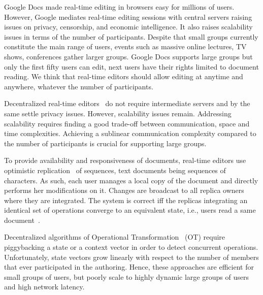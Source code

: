 
Google Docs made real-time editing in browsers easy for millions of
users. However, Google mediates real-time editing sessions with central servers
raising issues on privacy, censorship, and economic intelligence. It also raises
scalability issues in terms of the number of participants.  Despite that small
groups currently constitute the main range of users, events such as massive
online lectures, TV shows, conferences gather larger groups.  Google Docs
supports large groups but only the first fifty users can edit, next users have
their rights limited to document reading.  We think that real-time editors
should allow editing at anytime and anywhere, whatever the number of
participants.


Decentralized real-time editors~\cite{oster2006data, sun1998operational,
  sun2009contextbased} do not require intermediate servers and by the same
settle privacy issues. However, scalability issues remain.  Addressing
scalability requires finding a good trade-off between communication, space and
time complexities. Achieving a sublinear communication complexity compared to
the number of participants is crucial for supporting large groups.


To provide availability and responsiveness of documents, real-time editors use
optimistic replication~\cite{saito2005optimistic} of sequences, text documents
being sequences of characters. As such, each user manages a local copy of the
document and directly performs her modifications on it. Changes are broadcast to
all replica owners where they are integrated. The system is correct iff the
replicas integrating an identical set of operations converge to an equivalent
state, i.e., users read a same document~\cite{shapiro2011conflict}.

Decentralized algorithms of Operational
Transformation~\cite{sun2009contextbased} (OT) require piggybacking a state or a
context vector in order to detect concurrent operations. Unfortunately, state
vectors grow linearly with respect to the number of members that ever
participated in the authoring. Hence, these approaches are efficient for small
groups of users, but poorly scale to highly dynamic large groups of users and
high network latency.

